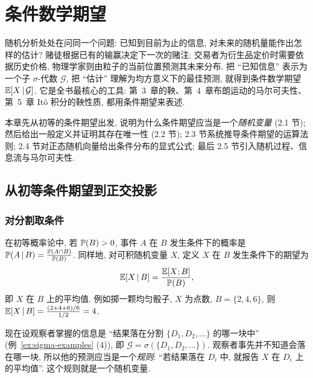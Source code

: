 \chapter{条件数学期望}
\label{ch:2}

随机分析处处在问同一个问题: 已知到目前为止的信息, 对未来的随机量能作出怎样的估计? 赌徒根据已有的输赢决定下一次的赌注; 交易者为衍生品定价时需要依据历史价格, 物理学家则由粒子的当前位置预测其未来分布. 把 ``已知信息'' 表示为一个子 $\sigma$-代数 $\mathcal{G}$, 把 ``估计'' 理解为均方意义下的最佳预测, 就得到条件数学期望 $\E[X\,|\,\mathcal{G}]$. 它是全书最核心的工具: 第~3~章的鞅、第~4~章布朗运动的马尔可夫性、第~5~章 Itô 积分的鞅性质, 都用条件期望来表述.

本章先从初等的条件期望出发, 说明为什么条件期望应当是一个\emph{随机变量} (2.1 节); 然后给出一般定义并证明其存在唯一性 (2.2 节); 2.3 节系统推导条件期望的运算法则; 2.4 节对正态随机向量给出条件分布的显式公式; 最后 2.5 节引入随机过程、信息流与马尔可夫性.

\section{从初等条件期望到正交投影}
\label{sec:2-1}

\subsection{对分割取条件}

在初等概率论中, 若 $\P(B)>0$, 事件 $A$ 在 $B$ 发生条件下的概率是 $\P(A\,|\,B)=\frac{\P(A\cap B)}{\P(B)}$. 同样地, 对可积随机变量 $X$, 定义 $X$ 在 $B$ 发生条件下的期望为
\begin{equation}\label{eq:elementary-ce}
\E[X\,|\,B]=\frac{\E[X;B]}{\P(B)},
\end{equation}
即 $X$ 在 $B$ 上的平均值. 例如掷一颗均匀骰子, $X$ 为点数, $B=\{2,4,6\}$, 则 $\E[X\,|\,B]=\frac{(2+4+6)/6}{1/2}=4$.

现在设观察者掌握的信息是 ``结果落在分割 $\{D_1,D_2,\dots\}$ 的哪一块中'' (例~\ref{ex:sigma-examples} (4)), 即 $\mathcal{G}=\sigma(\{D_1,D_2,\dots\})$. 观察者事先并不知道会落在哪一块, 所以他的预测应当是一个\emph{规则}: ``若结果落在 $D_i$ 中, 就报告 $X$ 在 $D_i$ 上的平均值''. 这个规则就是一个随机变量.

